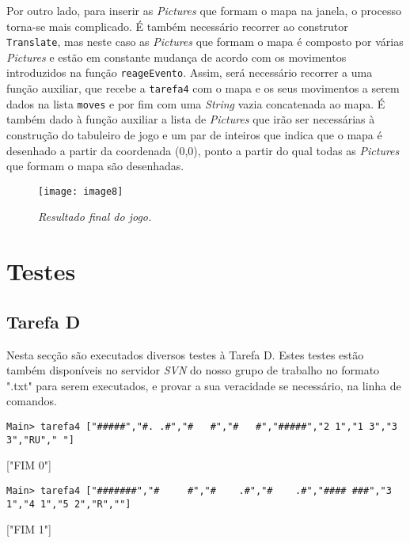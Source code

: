 \documentclass[a4paper,12pt]{report}
\begin{document}
Por outro lado, para inserir as {\sl Pictures} que formam o mapa na janela, o processo torna-se mais complicado. É também necessário recorrer ao construtor {\footnotesize\tt Translate}, mas neste caso as {\sl Pictures} que formam o mapa é composto por várias {\sl Pictures} e estão em constante mudança de acordo com os movimentos introduzidos na função {\footnotesize\tt reageEvento}. Assim, será necessário recorrer a uma função auxiliar, que recebe a {\footnotesize\tt tarefa4} com o mapa e os seus movimentos a serem dados na lista {\footnotesize\tt moves} e por fim com uma {\sl String} vazia concatenada ao mapa. É também dado à função auxiliar a lista de {\sl Pictures} que irão ser necessárias à construção do tabuleiro de jogo e um par de inteiros que indica que o mapa é desenhado a partir da coordenada (0,0), ponto a partir do qual todas as {\sl Pictures} que formam o mapa são desenhadas.
\\
\begin{figure}[h]
	\centering
	\texttt{[image: image8]}
	\caption{\small\sl Resultado final do jogo.}
	\captionsetup[figure]{list=yes}
\end{figure}











\chapter {Testes}

\section{Tarefa D}

Nesta secção são executados diversos testes à Tarefa D. Estes testes estão também disponíveis no servidor {\sl SVN} do nosso grupo de trabalho no formato ".txt" para serem executados, e provar a sua veracidade se necessário, na linha de comandos.
\\
\begin{tcolorbox}[width=\textwidth,colback={black},title={\sf Teste D.1:},outer arc=0mm,colupper=white]    
	{\footnotesize\tt *Main> tarefa4 ["\#\#\#\#\#","\#. .\#","\#   \#","\#   \#","\#\#\#\#\#","2 1","1 3","3 3","RU"," "]
		
		["FIM 0"] }
\end{tcolorbox} 

\begin{tcolorbox}[width=\textwidth,colback={black},title={\sf Teste D.2:},outer arc=0mm,colupper=white]    
	{\footnotesize\tt *Main> tarefa4 ["\#\#\#\#\#\#\#","\#     \#","\#    .\#","\#    .\#","\#\#\#\# \#\#\#","3 1","4 1","5 2","R",""]
		
		["FIM 1"] }
\end{tcolorbox} 
\end{document}
